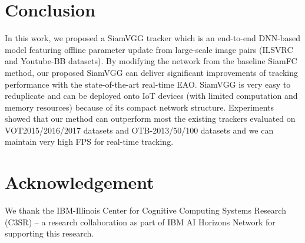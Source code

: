 \documentclass[runningheads]{llncs}
\begin{document}
\section{Conclusion}
\label{sec:conclusion}
In this work, we proposed a SiamVGG tracker which is an end-to-end DNN-based model featuring offline parameter update from large-scale image pairs (ILSVRC and Youtube-BB datasets). By modifying the network from the baseline SiamFC method, our proposed SiamVGG can deliver significant improvements of tracking performance with the state-of-the-art real-time EAO. SiamVGG is very easy to reduplicate and can be deployed onto IoT devices (with limited computation and memory resources) because of its compact network structure. Experiments showed that our method can outperform most the existing trackers evaluated on VOT2015/2016/2017 datasets and OTB-2013/50/100 datasets and we can maintain very high FPS for real-time tracking.

\section{Acknowledgement}
We thank the IBM-Illinois Center for Cognitive Computing Systems Research (C3SR) – a research collaboration as part of IBM AI Horizons Network for supporting this research.
\end{document}
